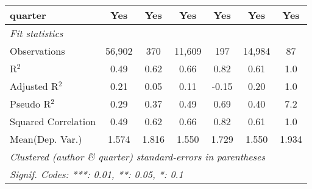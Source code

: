 \begin{tabular}{lcccccc}
   quarter                                                    & Yes            & Yes           & Yes            & Yes         & Yes           & Yes\\  
   \midrule
   \emph{Fit statistics}\\
   Observations                                               & 56,902         & 370           & 11,609         & 197         & 14,984        & 87\\  
   R$^2$                                                      & 0.49           & 0.62          & 0.66           & 0.82        & 0.61          & 1.0\\  
   Adjusted R$^2$                                             & 0.21           & 0.05          & 0.11           & -0.15       & 0.20          & 1.0\\  
   Pseudo R$^2$                                               & 0.29           & 0.37          & 0.49           & 0.69        & 0.40          & 7.2\\  
   Squared Correlation                                        & 0.49           & 0.62          & 0.66           & 0.82        & 0.61          & 1.0\\  
Mean(Dep. Var.) & 1.574 & 1.816 & 1.550 & 1.729 & 1.550 & 1.934 \\
   \midrule \midrule
   \multicolumn{7}{l}{\emph{Clustered (author \& quarter) standard-errors in parentheses}}\\
   \multicolumn{7}{l}{\emph{Signif. Codes: ***: 0.01, **: 0.05, *: 0.1}}\\
\end{tabular}
\par\endgroup
